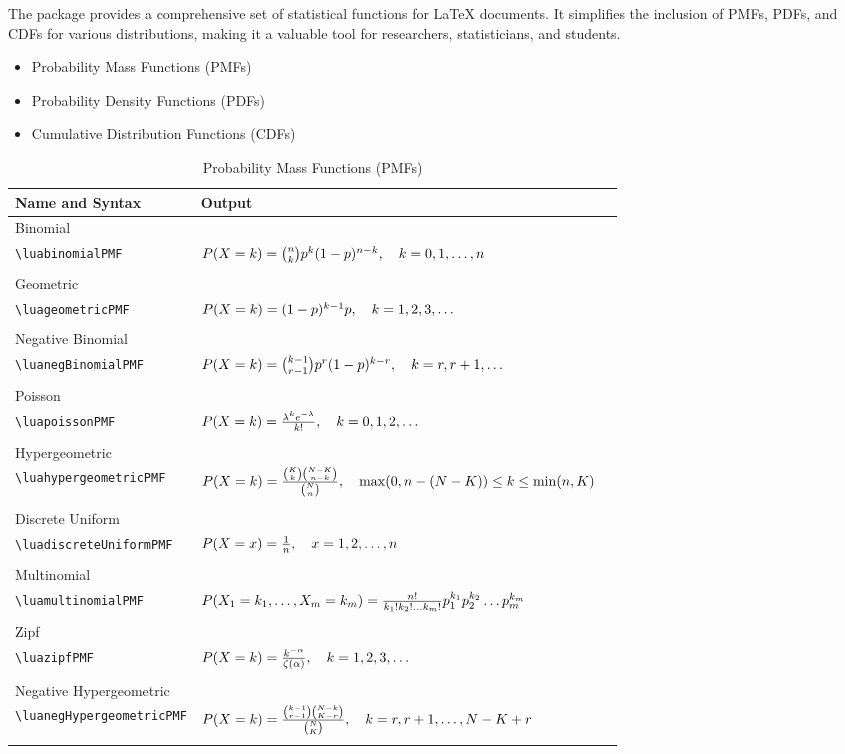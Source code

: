 \newpage
The package provides a comprehensive set of statistical functions for LaTeX documents. It simplifies the inclusion of PMFs, PDFs, and CDFs for various distributions, making it a valuable tool for researchers, statisticians, and students.
\begin{itemize}
	\item Probability Mass Functions (PMFs)
	\item Probability Density Functions (PDFs)
	\item Cumulative Distribution Functions (CDFs)
\end{itemize}

\begin{table}[ht]
	\centering
	\renewcommand{\arraystretch}{1.5}
	\small %
	\begin{tabularx}{\textwidth}{lXl}
		\toprule
		\textbf{Name and Syntax} & \textbf{Output} \\
		\midrule
		Binomial \\ \verb|\luabinomialPMF| & $ P(X = k) = \binom{n}{k} p^k (1 - p)^{n - k}, \quad k = 0, 1, \dots, n $ \\ \\
		Geometric \\ \verb|\luageometricPMF| & $\luageometricPMF$ \\\\ 
		Negative Binomial \\ \verb|\luanegBinomialPMF| & $\luanegBinomialPMF$ \\\\
		Poisson \\ \verb|\luapoissonPMF| & $\luapoissonPMF$ \\\\
		Hypergeometric \\ \verb|\luahypergeometricPMF| & $ P(X = k) = \frac{\binom{K}{k} \binom{N - K}{n - k}}{\binom{N}{n}}, \quad \max(0, n - (N-K)) \leq k \leq \min(n, K) $ \\\\
		Discrete Uniform \\ \verb|\luadiscreteUniformPMF| & $ P(X = x) = \frac{1}{n}, \quad x = 1, 2, \dots, n $ \\\\
		Multinomial \\ \verb|\luamultinomialPMF| & $ P(X_1 = k_1, \dots, X_m = k_m) = \frac{n!}{k_1! k_2! \dots k_m!} p_1^{k_1} p_2^{k_2} \dots p_m^{k_m} $ \\\\
		Zipf \\ \verb|\luazipfPMF| & $\luazipfPMF$ \\\\
		Negative Hypergeometric \\ \verb|\luanegHypergeometricPMF| & $ P(X = k) = \frac{\binom{k-1}{r-1} \binom{N-k}{K-r}}{\binom{N}{K}}, \quad k = r, r+1, \dots, N-K+r $ \\\\
		\bottomrule
	\end{tabularx}
	\caption{Probability Mass Functions (PMFs)}
\end{table}
\newpage


